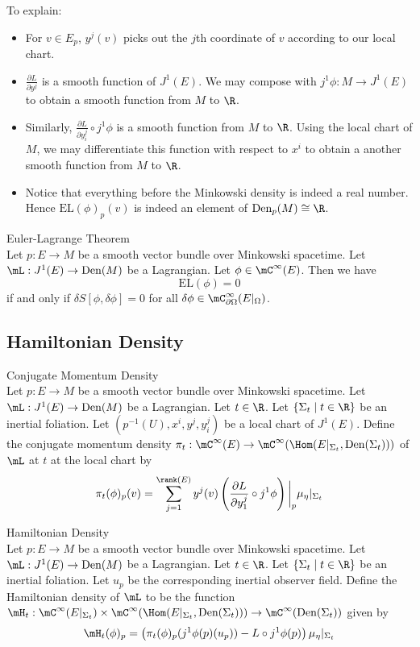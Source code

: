 \documentclass[a4paper]{article}
\begin{document}
To explain: 
\begin{itemize}
\item For $v\in E_p$, $y^j(v)$ picks out the $j$th coordinate of $v$ according to our local chart. 
\item $\frac{\partial L}{\partial y^j}$ is a smooth function of $J^1(E)$. We may compose with $j^1\phi:M\to J^1(E)$ to obtain a smooth function from $M$ to $\R$. 
\item Similarly, $\frac{\partial L}{\partial y_i^j}\circ j^1\phi$ is a smooth function from $M$ to $\R$. Using the local chart of $M$, we may differentiate this function with respect to $x^i$ to obtain a another smooth function from $M$ to $\R$. 
\item Notice that everything before the Minkowski density is indeed a real number. Hence $\text{EL}(\phi)_p(v)$ is indeed an element of $\text{Den}_p(M)\cong\R$. 
\end{itemize}

\begin{thm}{Euler-Lagrange Theorem}{}\\
Let $p:E\to M$ be a smooth vector bundle over Minkowski spacetime. Let $\mL:J^1(E)\to\text{Den}(M)$ be a Lagrangian. Let $\phi\in\mC^\infty(E)$. Then we have $$\text{EL}(\phi)=0$$ if and only if $\delta S[\phi,\delta\phi]=0$ for all $\delta\phi\in\mC_{\partial\Omega}^\infty(E|_\Omega)$. 
\end{thm}

\subsection{Hamiltonian Density}
\begin{defn}{Conjugate Momentum Density}{}\\
Let $p:E\to M$ be a smooth vector bundle over Minkowski spacetime. Let $\mL:J^1(E)\to\text{Den}(M)$ be a Lagrangian. Let $t\in\R$. Let $\{\Sigma_t\;|\;t\in\R\}$ be an inertial foliation. Let $(p^{-1}(U),x^i,y^j,y_i^j)$ be a local chart of $J^1(E)$. Define the conjugate momentum density $\pi_t:\mC^\infty(E)\to\mC^\infty(\Hom(E|_{\Sigma_t},\text{Den}(\Sigma_t)))$ of $\mL$ at $t$ at the local chart by $$\pi_t(\phi)_p(v)=\sum_{j=1}^{\rank(E)}y^j(v)\left(\frac{\partial L}{\partial y_1^j}\circ j^1\phi\right)\bigg{|}_p\mu_\eta|_{\Sigma_t}$$
\end{defn}

\begin{defn}{Hamiltonian Density}{}\\
Let $p:E\to M$ be a smooth vector bundle over Minkowski spacetime. Let $\mL:J^1(E)\to\text{Den}(M)$ be a Lagrangian. Let $t\in\R$. Let $\{\Sigma_t\;|\;t\in\R\}$ be an inertial foliation. Let $u_p$ be the corresponding inertial observer field. Define the Hamiltonian density of $\mL$ to be the function $\mH_t:\mC^\infty(E|_{\Sigma_t})\times\mC^\infty(\Hom(E|_{\Sigma_t},\text{Den}(\Sigma_t)))\to\mC^\infty(\text{Den}(\Sigma_t))$ given by $$\mH_t(\phi)_p=\left(\pi_t(\phi)_p(j^1\phi(p)(u_p))-L\circ j^1\phi(p)\right)\mu_\eta|_{\Sigma_t}$$
\end{defn}
\end{document}
